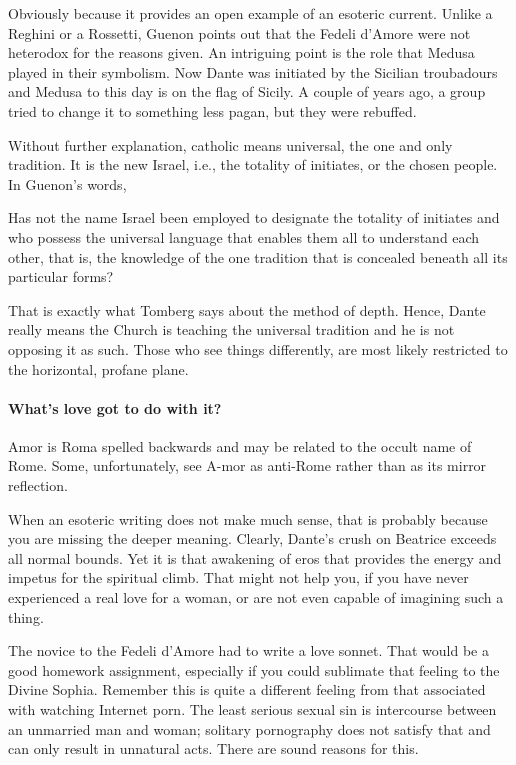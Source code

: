 Obviously because it provides an open example of an esoteric current. Unlike a Reghini or a Rossetti, Guenon points out that the Fedeli d'Amore were not heterodox for the reasons given. An intriguing point is the role that Medusa played in their symbolism. Now Dante was initiated by the Sicilian troubadours and Medusa to this day is on the flag of Sicily. A couple of years ago, a group tried to change it to something less pagan, but they were rebuffed.

Without further explanation, catholic means universal, the one and only tradition. It is the new Israel, i.e., the totality of initiates, or the chosen people. In Guenon's words,

Has not the name Israel been employed to designate the totality of initiates and who possess the universal language that enables them all to understand each other, that is, the knowledge of the one tradition that is concealed beneath all its particular forms?

That is exactly what Tomberg says about the method of depth. Hence, Dante really means the Church is teaching the universal tradition and he is not opposing it as such. Those who see things differently, are most likely restricted to the horizontal, profane plane.

\paragraph{What's love got to do with it?}


Amor is Roma spelled backwards and may be related to the occult name of Rome. Some, unfortunately, see A-mor as anti-Rome rather than as its mirror reflection.

When an esoteric writing does not make much sense, that is probably because you are missing the deeper meaning. Clearly, Dante's crush on Beatrice exceeds all normal bounds. Yet it is that awakening of eros that provides the energy and impetus for the spiritual climb. That might not help you, if you have never experienced a real love for a woman, or are not even capable of imagining such a thing.

The novice to the Fedeli d'Amore had to write a love sonnet. That would be a good homework assignment, especially if you could sublimate that feeling to the Divine Sophia. Remember this is quite a different feeling from that associated with watching Internet porn. The least serious sexual sin is intercourse between an unmarried man and woman; solitary pornography does not satisfy that and can only result in unnatural acts. There are sound reasons for this.

